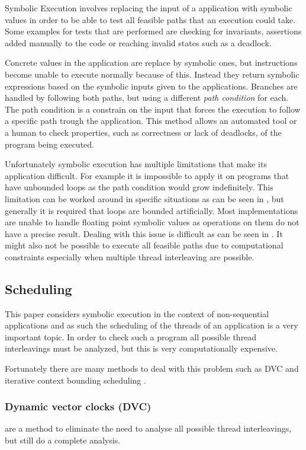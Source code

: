 \documentclass[10pt]{llncs}
\begin{document}
Symbolic Execution involves replacing the input of a application with symbolic values in order to be able to test all feasible paths that an execution could take. Some examples for tests that are performed are checking for invariants, assertions added manually to the code or reaching invalid states such as a deadlock.

Concrete values in the application are replace by symbolic ones, but instructions become unable to execute normally because of this. Instead they return symbolic expressions based on the symbolic inputs given to the applications. Branches are handled by following both paths, but using a different \emph{path condition} for each. The path condition is a constrain on the input that forces the execution to follow a specific path trough the application. This method allows an automated tool or a human to check properties, such as correctness or lack of deadlocks, of the program being executed.

Unfortunately symbolic execution has multiple limitations that make its application difficult. For example it is impossible to apply it on programs that have unbounded loops as the path condition would grow indefinitely. This limitation can be worked around in specific situations as can be seen in \cite{base5}, but generally it is required that loops are bounded artificially. Most implementations are unable to handle floating point symbolic values as operations on them do not have a precise result. Dealing with this issue is difficult as can be seen in \cite{base1}. It might also not be possible to execute all feasible paths due to computational constraints especially when multiple thread interleaving are possible.

\subsection{Scheduling}

This paper considers symbolic execution in the context of non-sequential applications and as such the scheduling of the threads of an application is a very important topic. In order to check such a program all possible thread interleavings must be analyzed, but this is very computationally expensive. 

Fortunately there are many methods to deal with this problem such as DVC \cite{dvc} and iterative context bounding scheduling \cite{musuvathi2007iterative}.

\subsubsection{Dynamic vector clocks (DVC)} are a method to eliminate the need to analyse all possible thread interleavings, but still do a complete analysis.
\end{document}
